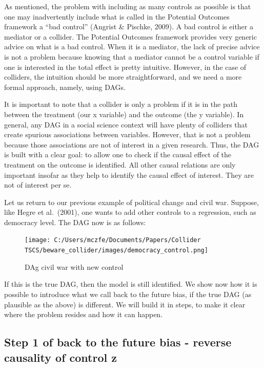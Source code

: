 \documentclass[
  super,
  preprint,
  3p]{elsarticle}
\begin{document}
As mentioned, the problem with including as many controls as possible is
that one may inadvertently include what is called in the Potential
Outcomes framework a ``bad control'' (Angrist \& Pischke, 2009). A bad
control is either a mediator or a collider. The Potential Outcomes
framework provides very generic advice on what is a bad control. When it
is a mediator, the lack of precise advice is not a problem because
knowing that a mediator cannot be a control variable if one is
interested in the total effect is pretty intuitive. However, in the case
of colliders, the intuition should be more straightforward, and we need
a more formal approach, namely, using DAGs.

It is important to note that a collider is only a problem if it is in
the path between the treatment (our x variable) and the outcome (the y
variable). In general, any DAG in a social science context will have
plenty of colliders that create spurious associations between variables.
However, that is not a problem because those associations are not of
interest in a given research. Thus, the DAG is built with a clear goal:
to allow one to check if the causal effect of the treatment on the
outcome is identified. All other causal relations are only important
insofar as they help to identify the causal effect of interest. They are
not of interest per se.

Let us return to our previous example of political change and civil war.
Suppose, like Hegre et al.~(2001), one wants to add other controls to a
regression, such as democracy level. The DAG now is as follows:

\begin{figure}

{\centering \texttt{[image: C:/Users/mczfe/Documents/Papers/Collider TSCS/beware\_collider/images/democracy\_control.png]}

}

\caption{DAg civil war with new control}

\end{figure}

If this is the true DAG, then the model is still identified. We show now
how it is possible to introduce what we call back to the future bias, if
the true DAG (as plausible as the above) is different. We will build it
in steps, to make it clear where the problem resides and how it can
happen.

\hypertarget{step-1-of-back-to-the-future-bias---reverse-causality-of-control-z}{%
\subsection{Step 1 of back to the future bias - reverse causality of
control
z}\label{step-1-of-back-to-the-future-bias---reverse-causality-of-control-z}}
\end{document}
